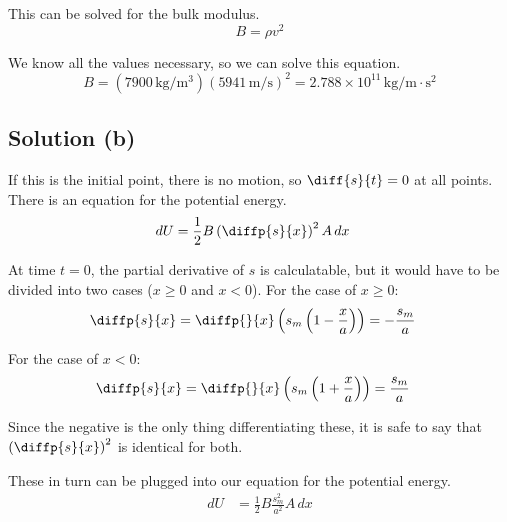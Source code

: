 \documentclass[12pt]{article}
\newcommand{\E}[1]{\times 10^{#1}}
\begin{document}
            This can be solved for the bulk modulus.
            \begin{equation}
                B   =   \rho v^2
            \end{equation}

            We know all the values necessary, so we can solve this equation.
            \begin{equation}
                B   =   (7900\,\unit{\kilo\gram/\meter^3}) (5941\,\unit{\meter/\second})^2
                    =   \boxed{2.788\E{11}\,\unit{\kilo\gram/\meter\cdot\second^2}}
            \end{equation}
        
        \subsection{Solution (b)}
            If this is the initial point, there is no motion, so $\diff{s}{t} = 0$ at all points.
            There is an equation for the potential energy.
            \begin{align}
                dU  &=  \frac{1}{2} B \left( \diffp{s}{x} \right)^2 A\,dx
            \end{align}

            At time $t = 0$, the partial derivative of $s$ is calculatable, but it would have to be divided into two cases ($x \geq 0$ and $x < 0$).
            For the case of $x \geq 0$:
            \begin{align}
                \diffp{s}{x}    &=  \diffp{}{x}\left( s_m \left( 1 - \frac{x}{a} \right) \right)
                    =   -\frac{s_m}{a}
            \end{align}

            For the case of $x < 0$:
            \begin{align}
                \diffp{s}{x}    &=  \diffp{}{x}\left( s_m \left( 1 + \frac{x}{a} \right) \right)
                    =   \frac{s_m}{a}
            \end{align}

            Since the negative is the only thing differentiating these, it is safe to say that $\left( \diffp{s}{x} \right)^2$ is identical for both.

            These in turn can be plugged into our equation for the potential energy.
            \begin{align}
                dU  &=  \frac{1}{2} B \frac{s_m^2}{a^2} A\,dx
            \end{align}
\end{document}
